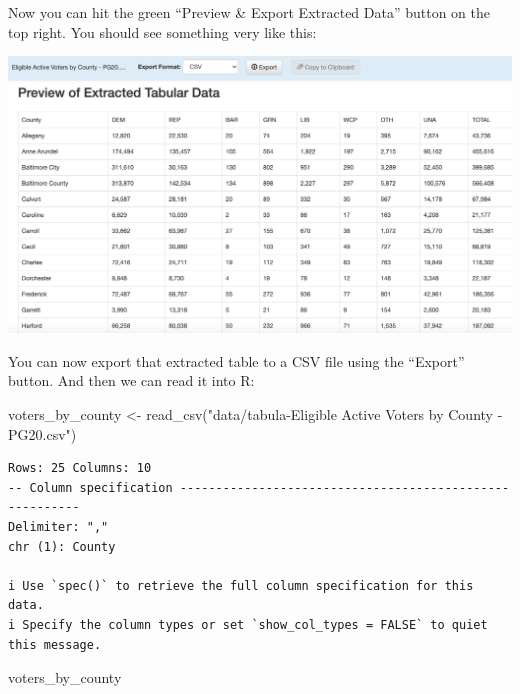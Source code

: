 \documentclass[
  letterpaper,
  DIV=11,
  numbers=noendperiod]{scrreprt}
\newenvironment{Shaded}{\begin{snugshade}}{\end{snugshade}}
\newcommand{\FunctionTok}[1]{\textcolor[rgb]{0.28,0.35,0.67}{#1}}
\newcommand{\NormalTok}[1]{\textcolor[rgb]{0.00,0.23,0.31}{#1}}
\newcommand{\OtherTok}[1]{\textcolor[rgb]{0.00,0.23,0.31}{#1}}
\newcommand{\StringTok}[1]{\textcolor[rgb]{0.13,0.47,0.30}{#1}}
\begin{document}
Now you can hit the green ``Preview \& Export Extracted Data'' button on
the top right. You should see something very like this:

\includegraphics[width=7.83in,height=\textheight]{./images/md_voters2.png}

You can now export that extracted table to a CSV file using the
``Export'' button. And then we can read it into R:

\begin{Shaded}
\begin{Highlighting}[]
\NormalTok{voters\_by\_county }\OtherTok{\textless{}{-}} \FunctionTok{read\_csv}\NormalTok{(}\StringTok{"data/tabula{-}Eligible Active Voters by County {-} PG20.csv"}\NormalTok{)}
\end{Highlighting}
\end{Shaded}

\begin{verbatim}
Rows: 25 Columns: 10
-- Column specification --------------------------------------------------------
Delimiter: ","
chr (1): County

i Use `spec()` to retrieve the full column specification for this data.
i Specify the column types or set `show_col_types = FALSE` to quiet this message.
\end{verbatim}

\begin{Shaded}
\begin{Highlighting}[]
\NormalTok{voters\_by\_county}
\end{Highlighting}
\end{Shaded}
\end{document}
